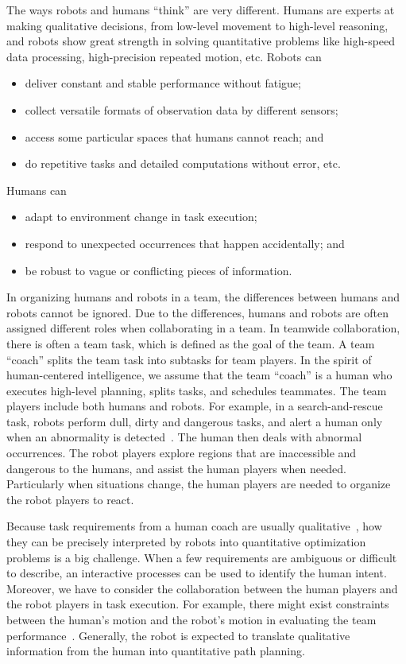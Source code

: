\documentclass[phd]{byuprop}
\begin{document}
The ways robots and humans ``think'' are very different.
Humans are experts at making qualitative decisions, from low-level movement to high-level reasoning,
and robots show great strength in solving quantitative problems like high-speed data processing, high-precision repeated motion, etc.
Robots can
\begin{itemize}
\item deliver constant and stable performance without fatigue;
\item collect versatile formats of observation data by different sensors;
\item access some particular spaces that humans cannot reach; and
\item do repetitive tasks and detailed computations without error, etc.
\end{itemize}
Humans can
\begin{itemize}
\item adapt to environment change in task execution;
\item respond to unexpected occurrences that happen accidentally; and
\item be robust to vague or conflicting pieces of information. 
\end{itemize}
In organizing humans and robots in a team, the differences between humans and robots cannot be ignored.
Due to the differences, humans and robots are often assigned different roles when collaborating in a team.
In teamwide collaboration, there is often a team task, which is defined as the goal of the team.
A team ``coach'' splits the team task into subtasks for team players.
In the spirit of human-centered intelligence, we assume that the team ``coach'' is a human who executes high-level planning, splits tasks, and schedules teammates.
The team players include both humans and robots.
For example, in a search-and-rescue task, robots perform dull, dirty and dangerous tasks, and alert a human only when an abnormality is detected~\cite{Nourbakhsh2005}.
The human then deals with abnormal occurrences.
The robot players explore regions that are inaccessible and dangerous to the humans, and assist the human players when needed.
Particularly when situations change, the human players are needed to organize the robot players to react.

Because task requirements from a human coach are usually qualitative~\cite{brenner2007mediating}, how they can be precisely interpreted by robots into quantitative optimization problems is a big challenge.
When a few requirements are ambiguous or difficult to describe, an interactive processes can be used to identify the human intent.
Moreover, we have to consider the collaboration between the human players and the robot players in task execution.
For example, there might exist constraints between the human's motion and the robot's motion in evaluating the team performance~\cite{Yi2014a}.
Generally, the robot is expected to translate qualitative information from the human into quantitative path planning.
\end{document}
